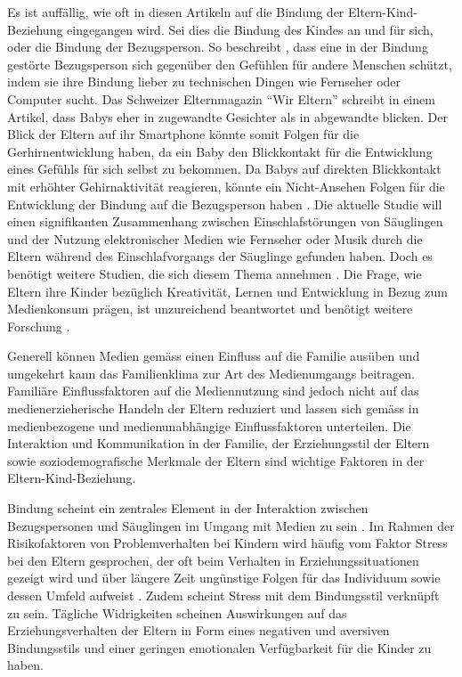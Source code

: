 Es ist auffällig, wie oft in diesen Artikeln auf die Bindung der Eltern-Kind-Beziehung eingegangen wird. Sei dies die Bindung des Kindes an und für sich, oder die Bindung der Bezugsperson. So beschreibt , dass eine in der Bindung gestörte Bezugsperson sich gegenüber den Gefühlen für andere Menschen schützt, indem sie ihre Bindung lieber zu technischen Dingen wie Fernseher oder Computer sucht. Das Schweizer Elternmagazin \enquote{Wir Eltern} schreibt in einem Artikel, dass Babys eher in zugewandte Gesichter als in abgewandte blicken. Der Blick der Eltern auf ihr Smartphone könnte somit Folgen für die Gerhirnentwicklung haben, da ein Baby den Blickkontakt für die Entwicklung eines Gefühls für sich selbst zu bekommen. Da Babys auf direkten Blickkontakt mit erhöhter Gehirnaktivität reagieren, könnte ein Nicht-Ansehen Folgen für die Entwicklung der Bindung auf die Bezugsperson haben \cite{Weber2017}. Die aktuelle Studie  will einen signifikanten Zusammenhang zwischen Einschlafstörungen von Säuglingen und der Nutzung elektronischer Medien wie Fernseher oder Musik durch die Eltern während des Einschlafvorgangs der Säuglinge gefunden haben. Doch es benötigt weitere Studien, die sich diesem Thema annehmen \cite{Wartella2016}. Die Frage, wie Eltern ihre Kinder bezüglich Kreativität, Lernen und Entwicklung in Bezug zum Medienkonsum prägen, ist unzureichend beantwortet und benötigt weitere Forschung \cite{AmericanAcademyofPediatrics2011,Troseth2016}. 

Generell können Medien gemäss  einen Einfluss auf die Familie ausüben und umgekehrt kann das Familienklima zur Art des Medienumgangs beitragen. Familiäre Einflussfaktoren auf die Mediennutzung sind  jedoch  nicht  auf  das  medienerzieherische  Handeln  der  Eltern  reduziert  und  lassen sich gemäss  in medienbezogene und medienunabhängige Einflussfaktoren unterteilen. Die Interaktion und Kommunikation in der Familie, der Erziehungsstil der Eltern sowie soziodemografische Merkmale der Eltern sind wichtige Faktoren in der Eltern-Kind-Beziehung.

Bindung scheint ein zentrales Element in der Interaktion zwischen Bezugspersonen und Säuglingen im Umgang mit Medien zu sein \cite{Prekop2017, Huether2017, Blikk2017}. Im Rahmen der Risikofaktoren von Problemverhalten bei Kindern wird häufig vom Faktor Stress bei den Eltern gesprochen, der oft beim Verhalten in Erziehungssituationen gezeigt wird und über längere Zeit ungünstige Folgen für das Individuum sowie dessen Umfeld aufweist \cite{Cina2009}. Zudem scheint Stress mit dem Bindungsstil verknüpft zu sein. Tägliche Widrigkeiten scheinen Auswirkungen auf das Erziehungsverhalten der Eltern in Form eines negativen und aversiven Bindungsstils \cite{Dumas1989, Webster-Stratton1988} und einer geringen emotionalen Verfügbarkeit für die Kinder \cite{Campbell1991} zu haben. 

